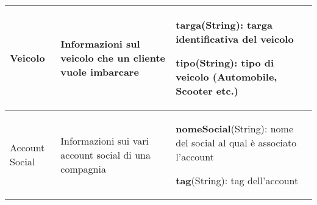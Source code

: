 \begin{longtable}{|| m{} | m{} | m{} ||}
     Veicolo & Informazioni sul veicolo che un cliente vuole imbarcare & 
     \textbf{targa}(String): targa identificativa del veicolo
     
     \textbf{tipo}(String): tipo di veicolo (Automobile, Scooter etc.)\\
     \hline
     
     Account Social & Informazioni sui vari account social di una compagnia &
     \textbf{nomeSocial}(String): nome del social al qual è associato l'account
     
     \textbf{tag}(String): tag dell'account\\
     \hline

     \hline\hline
     
\end{longtable}
